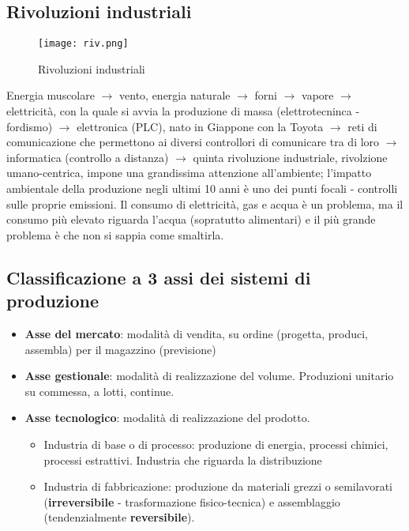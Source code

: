 \documentclass[../main.tex]{subfiles}
\begin{document}
\subsection{Rivoluzioni industriali}
\begin{figure}[h!]
    \centering
    \texttt{[image: riv.png]}
    \caption{Rivoluzioni industriali}
\end{figure}
Energia muscolare $\rightarrow$ vento, energia naturale $\rightarrow$ forni $\rightarrow$ vapore $\rightarrow$ elettricità, con la quale si avvia la produzione di massa (elettrotecninca - fordismo) $\rightarrow$ elettronica (PLC), nato in Giappone con la Toyota $\rightarrow$ reti di comunicazione che permettono ai diversi controllori di comunicare tra di loro $\rightarrow$ informatica (controllo a distanza) $\rightarrow$ quinta rivoluzione industriale, rivolzione umano-centrica, impone una grandissima attenzione all'ambiente; l'impatto ambientale della produzione negli ultimi 10 anni è uno dei punti focali - controlli sulle proprie emissioni. Il consumo di elettricità, gas e acqua è un problema, ma il consumo più elevato riguarda l'acqua (sopratutto alimentari) e il più grande problema è che non si sappia come smaltirla.

\subsection*{Classificazione a 3 assi dei sistemi di produzione}
\begin{itemize}
    \item \textbf{Asse del mercato}: modalità di vendita, su ordine (progetta, produci, assembla) per il magazzino (previsione)
    \item \textbf{Asse gestionale}: modalità di realizzazione del volume. Produzioni unitario su commessa, a lotti, continue. 
    \item \textbf{Asse tecnologico}: modalità di realizzazione del prodotto. \begin{itemize}
        \item Industria di base o di processo: produzione di energia, processi chimici, processi estrattivi. Industria che riguarda la distribuzione
        \item Industria di fabbricazione: produzione da materiali grezzi o semilavorati (\textbf{irreversibile} - trasformazione fisico-tecnica) e assemblaggio (tendenzialmente \textbf{reversibile}).
    \end{itemize}
\end{itemize}
\end{document}
